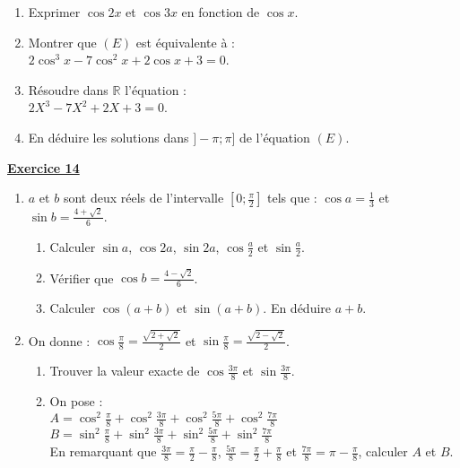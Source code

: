 \documentclass[12pt,a4paper]{article}
\begin{document}
\begin{multicols}{2}
\begin{enumerate}
    \item Exprimer \( \cos 2x \) et \( \cos 3x \) en fonction de \( \cos x \).

    \item Montrer que \( (E) \) est équivalente à :\\
    \( 2 \cos^3 x - 7 \cos^2 x + 2 \cos x + 3 = 0 \).

    \item Résoudre dans \( \mathbb{R} \) l’équation :\\
    \( 2X^3 - 7X^2 + 2X + 3 = 0 \).

    \item En déduire les solutions dans \( ] -\pi ; \pi] \) de l’équation \( (E) \).
\end{enumerate}

\textbf{\underline{Exercice 14}}
\begin{enumerate}
    \item \( a \) et \( b \) sont deux réels de l’intervalle \( \left[ 0 ; \frac{\pi}{2} \right] \) tels que :
    \( \cos a = \frac{1}{3} \) et \( \sin b = \frac{4 + \sqrt{2}}{6} \).
    \begin{enumerate}[label=\textbf{\alph*})]
        \item Calculer \( \sin a \), \( \cos 2a \), \( \sin 2a \), \( \cos \frac{a}{2} \) et \( \sin \frac{a}{2} \).
        \item Vérifier que \( \cos b = \frac{4 - \sqrt{2}}{6} \).
        \item Calculer \( \cos(a + b) \) et \( \sin(a + b) \). En déduire \( a + b \).
    \end{enumerate}

    \item On donne : \( \cos \frac{\pi}{8} = \frac{\sqrt{2 + \sqrt{2}}}{2} \) et \( \sin \frac{\pi}{8} = \frac{\sqrt{2 - \sqrt{2}}}{2} \).
    \begin{enumerate}
        \item Trouver la valeur exacte de \( \cos \frac{3\pi}{8} \) et \( \sin \frac{3\pi}{8} \).
        \item On pose :\\
        \( A = \cos^2 \frac{\pi}{8} + \cos^2 \frac{3\pi}{8} + \cos^2 \frac{5\pi}{8} + \cos^2 \frac{7\pi}{8} \)\\
        \( B = \sin^2 \frac{\pi}{8} + \sin^2 \frac{3\pi}{8} + \sin^2 \frac{5\pi}{8} + \sin^2 \frac{7\pi}{8} \)\\
        En remarquant que \( \frac{3\pi}{8} = \frac{\pi}{2} - \frac{\pi}{8} \), \( \frac{5\pi}{8} = \frac{\pi}{2} + \frac{\pi}{8} \)
        et \( \frac{7\pi}{8} = \pi - \frac{\pi}{8} \), calculer \( A \) et \( B \).
    \end{enumerate}


\end{enumerate}
\end{multicols}
\end{document}
